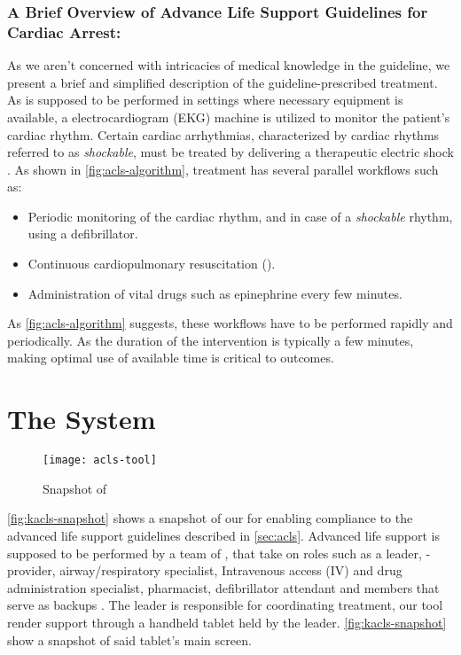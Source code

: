\subsubsection{A Brief Overview of Advance Life Support Guidelines for Cardiac Arrest:}

As we aren't concerned with intricacies of medical knowledge in the guideline,
we present a brief and simplified description of the guideline-prescribed treatment.
As \ALS{} is supposed to be performed in settings where necessary equipment is
available, a electrocardiogram (EKG) machine is utilized to
monitor the patient's cardiac rhythm. Certain cardiac arrhythmias, characterized
by cardiac rhythms referred to as \emph{shockable}, must be treated
by delivering a therapeutic electric shock
\cite{DefibrillationWikiEntry}. As shown in \autoref{fig:acls-algorithm},
treatment has several parallel workflows such as:
\begin{itemize}
  \item Periodic monitoring of the cardiac rhythm, and in case of a
    \emph{shockable} rhythm, using a defibrillator.
  \item Continuous cardiopulmonary resuscitation (\CPR{}).
  \item Administration of vital drugs such as
    epinephrine every few minutes.
\end{itemize}
As \autoref{fig:acls-algorithm} suggests, these workflows have to be
performed rapidly and periodically. As the duration of the intervention
is typically a few minutes, making optimal use of available time is critical to
outcomes.

\section{The \KACLS{} System}\label{sec:kacls-cdss}

\begin{figure}[t!]
  \centering
  \texttt{[image: acls-tool]}
  \caption{Snapshot of \KACLS{}}\label{fig:kacls-snapshot}
\end{figure}

\autoref{fig:kacls-snapshot} shows a snapshot of our \CDSS{} for
enabling compliance to the advanced life support guidelines described in
\autoref{sec:acls}. Advanced life support is supposed to be performed by
a team of \HCPs{}, that take on roles such as a leader, \CPR{}-provider,
airway/respiratory specialist, Intravenous access (IV) and drug administration
specialist, pharmacist, defibrillator attendant and members that serve as
backups \cite{ACLSWikiEntry}. The leader is responsible for coordinating
treatment, our tool render support through a handheld tablet held by the leader.
\autoref{fig:kacls-snapshot} show a snapshot of said tablet's main screen.

